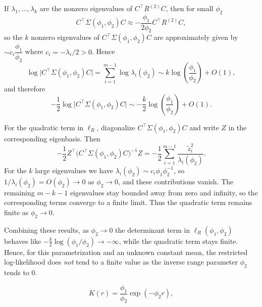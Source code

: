 \documentclass[answers,12pt,addpoints]{exam}
\begin{document}
\begin{questions}
\begin{solution}
If $\lambda_1, \ldots, \lambda_k$ are the nonzero eigenvalues of
$C^\top R^{(2)} C$, then for small $\phi_2$
\[
C^\top \Sigma(\phi_1, \phi_2) C
\approx - \frac{\phi_1}{2\phi_2} C^\top R^{(2)} C,
\]
so the $k$ nonzero eigenvalues of $C^\top \Sigma(\phi_1, \phi_2) C$
are approximately given by $\sim c_i \dfrac{\phi_1}{\phi_2}$ where
$c_i = -\lambda_i/2 > 0$. Hence
\[
\log \bigl| C^\top \Sigma(\phi_1, \phi_2) C \bigr|
= \sum_{i=1}^{m-1} \log \lambda_i(\phi_2)
\sim k \log\!\left(\frac{\phi_1}{\phi_2}\right) + O(1),
\]
and therefore
\[
-\frac{1}{2} \log \bigl| C^\top \Sigma(\phi_1, \phi_2) C \bigr|
\sim -\frac{k}{2} \log\!\left(\frac{\phi_1}{\phi_2}\right) + O(1).
\]

For the quadratic term in $\ell_R$, diagonalize
$C^\top \Sigma(\phi_1,\phi_2) C$ and write $Z$ in the corresponding
eigenbasis. Then
\[
-\frac{1}{2} Z^\top
   \bigl(C^\top \Sigma(\phi_1,\phi_2) C\bigr)^{-1} Z
= -\frac{1}{2} \sum_{i=1}^{m-1}
   \frac{\tilde z_i^2}{\lambda_i(\phi_2)}.
\]
For the $k$ large eigenvalues we have
$\lambda_i(\phi_2) \sim c_i \phi_1 \phi_2^{-1}$, so
$1/\lambda_i(\phi_2) = O(\phi_2) \to 0$ as $\phi_2 \to 0$, and these
contributions vanish. The remaining $m-k-1$ eigenvalues stay bounded
away from zero and infinity, so the corresponding terms converge to a
finite limit. Thus the quadratic term remains finite as
$\phi_2 \to 0$.

Combining these results, as $\phi_2 \to 0$ the determinant term in
$\ell_R(\phi_1,\phi_2)$ behaves like
$-\frac{k}{2} \log(\phi_1/\phi_2) \to -\infty$, while the quadratic
term stays finite. Hence, for this parametrization and an unknown
constant mean, the restricted log-likelihood does \emph{not} tend to a
finite value as the inverse range parameter $\phi_2$ tends to $0$.
\end{solution}



\begin{solution}
\[
K(r) = \frac{\phi_1}{\phi_2}\exp(-\phi_2 r),
\]


\end{solution}
\end{questions}
\end{document}
